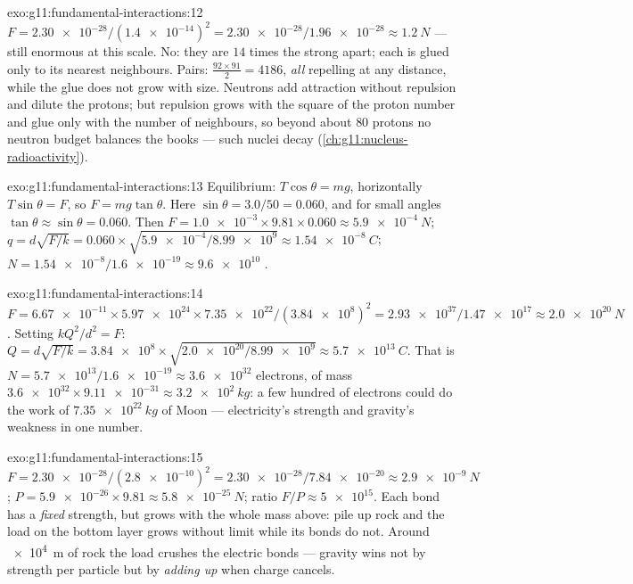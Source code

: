 \begin{solution}{exo:g11:fundamental-interactions:12}
$F = \num{2.30e-28}/(\num{1.4e-14})^2 = \num{2.30e-28}/\num{1.96e-28}
\approx \qty{1.2}{N}$ --- still enormous at this scale. No: they are
$14$ times the strong  apart; each is glued only to its nearest
neighbours. Pairs: $\frac{92 \times 91}{2} = 4186$, \emph{all}
repelling at any distance, while the glue does not grow with size.
Neutrons add attraction without repulsion and dilute the protons; but
repulsion grows with the square of the proton number and glue only with
the number of neighbours, so beyond about $80$ protons no neutron
budget balances the books --- such nuclei decay
(\cref{ch:g11:nucleus-radioactivity}).
\end{solution}

\begin{solution}{exo:g11:fundamental-interactions:13}
Equilibrium:  $T\cos\theta = mg$, horizontally
$T\sin\theta = F$, so $F = mg\tan\theta$. Here
$\sin\theta = 3.0/50 = 0.060$, and for small angles
$\tan\theta \approx \sin\theta = 0.060$. Then
$F = \num{1.0e-3} \times 9.81 \times 0.060 \approx \qty{5.9e-4}{N}$;
$q = d\sqrt{F/k} = 0.060 \times \sqrt{\num{5.9e-4}/\num{8.99e9}}
\approx \qty{1.54e-8}{C}$; $N = \num{1.54e-8}/\num{1.6e-19} \approx
\num{9.6e10}$ .
\end{solution}

\begin{solution}{exo:g11:fundamental-interactions:14}
$F = \num{6.67e-11} \times \num{5.97e24} \times \num{7.35e22} /
(\num{3.84e8})^2 = \num{2.93e37}/\num{1.47e17} \approx \qty{2.0e20}{N}$.
Setting $kQ^2/d^2 = F$:
$Q = d\sqrt{F/k} = \num{3.84e8} \times \sqrt{\num{2.0e20}/\num{8.99e9}}
\approx \qty{5.7e13}{C}$. That is
$N = \num{5.7e13}/\num{1.6e-19} \approx \num{3.6e32}$ electrons, of
mass $\num{3.6e32} \times \num{9.11e-31} \approx \qty{3.2e2}{kg}$: a
few hundred  of electrons could do the work of
$\qty{7.35e22}{kg}$ of Moon --- electricity's strength and gravity's
weakness in one number.
\end{solution}

\begin{solution}{exo:g11:fundamental-interactions:15}
$F = \num{2.30e-28}/(\num{2.8e-10})^2 = \num{2.30e-28}/\num{7.84e-20}
\approx \qty{2.9e-9}{N}$; 
$P = \num{5.9e-26} \times 9.81 \approx \qty{5.8e-25}{N}$; ratio
$F/P \approx \num{5e15}$. Each bond has a \emph{fixed} strength, but
 grows with the whole mass above: pile up rock and the load on
the bottom layer grows without limit while its bonds do not. Around
\qty{e4}{m} of rock the load crushes the electric bonds --- gravity
wins not by strength per particle but by \emph{adding up} when charge
cancels.
\end{solution}

